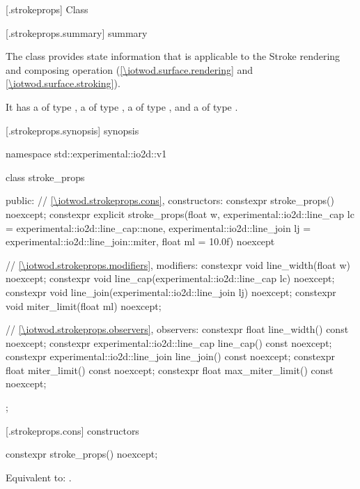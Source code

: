 
 [\iotwod.strokeprops] {Class }

 [\iotwod.strokeprops.summary] { summary}

\pnum
The  class provides state information that is applicable to the Stroke rendering and composing operation (\ref{\iotwod.surface.rendering} and \ref{\iotwod.surface.stroking}).

\pnum
It has a  of type , a  of type , a  of type , and a  of type .

 [\iotwod.strokeprops.synopsis] { synopsis}

\begin{codeblock}
namespace std::experimental::io2d::v1 {
  class stroke_props {
  public:
    // \ref{\iotwod.strokeprops.cons}, constructors:
    constexpr stroke_props() noexcept;
    constexpr explicit stroke_props(float w,
      experimental::io2d::line_cap lc = experimental::io2d::line_cap::none,
      experimental::io2d::line_join lj = experimental::io2d::line_join::miter,
      float ml = 10.0f) noexcept    

    // \ref{\iotwod.strokeprops.modifiers}, modifiers:
    constexpr void line_width(float w) noexcept;
    constexpr void line_cap(experimental::io2d::line_cap lc) noexcept;
    constexpr void line_join(experimental::io2d::line_join lj) noexcept;
    constexpr void miter_limit(float ml) noexcept;
    
    // \ref{\iotwod.strokeprops.observers}, observers:
    constexpr float line_width() const noexcept;
    constexpr experimental::io2d::line_cap line_cap() const noexcept;
    constexpr experimental::io2d::line_join line_join() const noexcept;
    constexpr float miter_limit() const noexcept;
    constexpr float max_miter_limit() const noexcept;
  };
}
\end{codeblock}

 [\iotwod.strokeprops.cons] { constructors}

%
\begin{itemdecl}
constexpr stroke_props() noexcept;
\end{itemdecl}
\begin{itemdescr}
\pnum
\effects
Equivalent to: .
\end{itemdescr}

